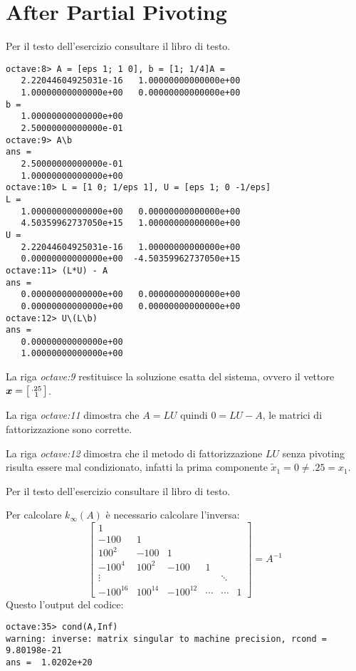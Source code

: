 \section{After Partial Pivoting}

\begin{exercise}[3.24]
Per il testo dell'esercizio consultare il libro di testo.
\end{exercise}
\begin{lstlisting}
octave:8> A = [eps 1; 1 0], b = [1; 1/4]A =
   2.22044604925031e-16   1.00000000000000e+00
   1.00000000000000e+00   0.00000000000000e+00
b =
   1.00000000000000e+00
   2.50000000000000e-01
octave:9> A\b
ans =
   2.50000000000000e-01
   1.00000000000000e+00
octave:10> L = [1 0; 1/eps 1], U = [eps 1; 0 -1/eps]
L =
   1.00000000000000e+00   0.00000000000000e+00
   4.50359962737050e+15   1.00000000000000e+00
U =
   2.22044604925031e-16   1.00000000000000e+00
   0.00000000000000e+00  -4.50359962737050e+15
octave:11> (L*U) - A
ans =
   0.00000000000000e+00   0.00000000000000e+00
   0.00000000000000e+00   0.00000000000000e+00
octave:12> U\(L\b)
ans =
   0.00000000000000e+00
   1.00000000000000e+00
\end{lstlisting}
La riga \emph{octave:9} restituisce la soluzione esatta del sistema, ovvero il
vettore $\boldsymbol{x} = \bigl [ \begin{smallmatrix}
.25 \\
1
\end{smallmatrix}\bigr ]$.

La riga \emph{octave:11} dimostra che $A = LU$ quindi $0 = LU - A$, le matrici
di fattorizzazione sono corrette.

La riga \emph{octave:12} dimostra che il metodo di fattorizzazione $LU$ senza
pivoting risulta essere mal condizionato, infatti la prima componente
$\tilde{x}_{1} = 0 \not = .25 = x_{1}$.

\begin{exercise}[3.25]
Per il testo dell'esercizio consultare il libro di testo.
\end{exercise}
Per calcolare $k_{\infty}(A)$ \`e necessario calcolare l'inversa:
\begin{displaymath}
\begin{bmatrix}
1 \\
-100 & 1 \\ 
100^{2} & -100 & 1\\ 
-100^{4} & 100^{2} & -100 & 1\\
\vdots & & & & \ddots \\
-100^{16} & 100^{14} & -100^{12} & \cdots & \cdots &  1
\end{bmatrix} = A^{-1}
\end{displaymath}
Questo l'output del codice:
\begin{lstlisting}
octave:35> cond(A,Inf)
warning: inverse: matrix singular to machine precision, rcond = 9.80198e-21
ans =  1.0202e+20
\end{lstlisting}

